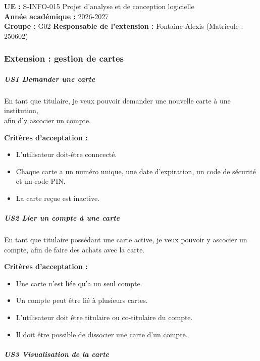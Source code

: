 \textbf{UE :} S-INFO-015 Projet d'analyse et de conception logicielle\\
\textbf{Année académique :} 2026-2027\\
\textbf{Groupe :} G02 \textbf{Responsable de l'extension :} Fontaine
Alexis (Matricule : 250602)

\hypertarget{extension-gestion-de-cartes}{%
\subsubsection{Extension : gestion de
cartes}\label{extension-gestion-de-cartes}}

\hypertarget{us1-demander-une-carte}{%
\subparagraph{US1 Demander une carte}\label{us1-demander-une-carte}}

En tant que titulaire, je veux pouvoir demander une nouvelle carte à une
institution,\\
afin d'y ascocier un compte.

\textbf{Critères d'acceptation :}

\begin{itemize}
\tightlist
\item
  L'utilisateur doit-être conncecté.
\item
  Chaque carte a un numéro unique, une date d'expiration, un code de
  sécurité et un code PIN.
\item
  La carte reçue est inactive.
\end{itemize}

\hypertarget{us2-lier-un-compte-uxe0-une-carte}{%
\subparagraph{US2 Lier un compte à une
carte}\label{us2-lier-un-compte-uxe0-une-carte}}

En tant que titulaire possédant une carte active, je veux pouvoir y
ascocier un compte, afin de faire des achats avec la carte.

\textbf{Critères d'acceptation :}

\begin{itemize}
\tightlist
\item
  Une carte n'est liée qu'a un seul compte.
\item
  Un compte peut être lié à plusieurs cartes.
\item
  L'utilisateur doit être titulaire ou co-titulaire du compte.
\item
  Il doit être possible de dissocier une carte d'un compte.
\end{itemize}

\hypertarget{us3-visualisation-de-la-carte}{%
\subparagraph{US3 Visualisation de la
carte}\label{us3-visualisation-de-la-carte}}

